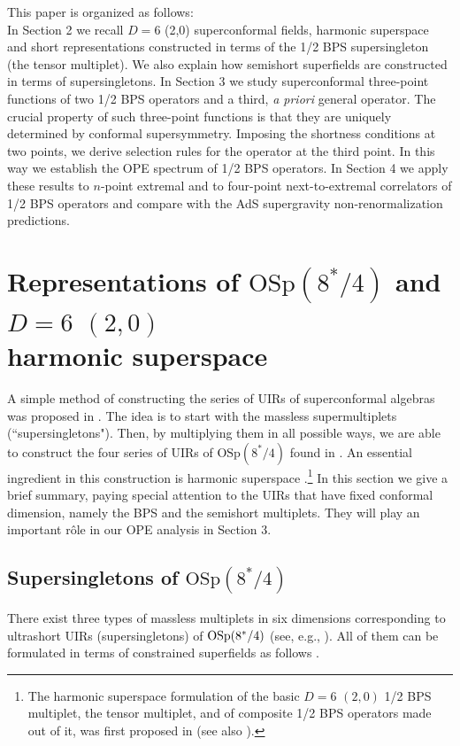 \documentclass[a4paper,11pt]{article}
\begin{document}
This paper is organized as follows: \\ In Section 2 we recall $D=6$ (2,0)
superconformal fields, harmonic superspace and short representations
constructed in terms of the 1/2 BPS supersingleton (the tensor multiplet). We
also explain how semishort superfields are constructed in terms of
supersingletons. In Section 3 we study superconformal three-point functions of
two 1/2 BPS operators and a third, {\it a priori} general operator. The crucial
property of such three-point functions is that they are uniquely determined by
conformal supersymmetry. Imposing the shortness conditions at two points, we
derive selection rules for the operator at the third point. In this way we
establish the OPE spectrum of 1/2 BPS operators. In Section 4 we apply these
results to $n$-point extremal and to four-point next-to-extremal correlators
of 1/2 BPS operators and compare with the AdS supergravity non-renormalization
predictions.





\section{Representations of $\mbox{OSp}(8^{*}/4)$ and $D=6$ $(2,0)$ \\
harmonic superspace}

A simple method of constructing the series of UIRs of
superconformal algebras was proposed in \cite{FS1}. The idea is to
start with the massless supermultiplets (``supersingletons").
Then, by multiplying them in all possible ways, we are able to
construct the four series of UIRs of $\mbox{OSp}(8^{*}/4)$ found
in \cite{Minw2}. An essential ingredient in this construction is
harmonic superspace \cite{GIK1}.\footnote{The harmonic superspace
formulation of the basic $D=6$ $(2,0)$ 1/2 BPS multiplet, the
tensor multiplet, and of composite 1/2 BPS operators made out of
it, was first proposed in \cite{Hproc} (see also \cite{Htensor}).}
In this section we give a brief summary, paying special attention
to the UIRs that have fixed conformal dimension, namely the BPS
and the semishort multiplets. They will play an important r\^ole
in our OPE analysis in Section 3.

\subsection{Supersingletons of  $\mbox{OSp}(8^{*}/4)$}

There exist three types of massless multiplets in six dimensions corresponding
to ultrashort UIRs (supersingletons) of $\mbox{\mbox{OSp}}(8^*/4)$ (see, e.g.,
\cite{GT}). All of them can be formulated in terms of constrained superfields
as follows \cite{FS2}.
\end{document}

